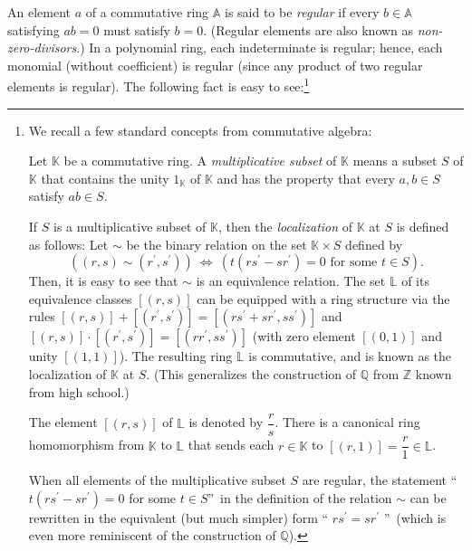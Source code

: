 \documentclass[numbers=enddot,12pt,final,onecolumn,notitlepage]{scrartcl}%
\theoremstyle{definition}
\begin{document}
An element $a$ of a commutative ring $\mathbb{A}$ is said to be
\textit{regular} if every $b\in\mathbb{A}$ satisfying $ab=0$ must satisfy
$b=0$. (Regular elements are also known as \textit{non-zero-divisors}.) In a
polynomial ring, each indeterminate is regular; hence, each monomial (without
coefficient) is regular (since any product of two regular elements is
regular). The following fact is easy to see:\footnote{We recall a few standard
concepts from commutative algebra:
\par
Let $\mathbb{K}$ be a commutative ring. A \textit{multiplicative subset} of
$\mathbb{K}$ means a subset $S$ of $\mathbb{K}$ that contains the unity
$1_{\mathbb{K}}$ of $\mathbb{K}$ and has the property that every $a,b\in S$
satisfy $ab\in S$.
\par
If $S$ is a multiplicative subset of $\mathbb{K}$, then the
\textit{localization} of $\mathbb{K}$ at $S$ is defined as follows: Let $\sim$
be the binary relation on the set $\mathbb{K}\times S$ defined by%
\[
\left(  \left(  r,s\right)  \sim\left(  r^{\prime},s^{\prime}\right)  \right)
\ \Longleftrightarrow\ \left(  t\left(  rs^{\prime}-sr^{\prime}\right)
=0\text{ for some }t\in S\right)  .
\]
Then, it is easy to see that $\sim$ is an equivalence relation. The set
$\mathbb{L}$ of its equivalence classes $\left[  \left(  r,s\right)  \right]
$ can be equipped with a ring structure via the rules $\left[  \left(
r,s\right)  \right]  +\left[  \left(  r^{\prime},s^{\prime}\right)  \right]
=\left[  \left(  rs^{\prime}+sr^{\prime},ss^{\prime}\right)  \right]  $ and
$\left[  \left(  r,s\right)  \right]  \cdot\left[  \left(  r^{\prime
},s^{\prime}\right)  \right]  =\left[  \left(  rr^{\prime},ss^{\prime}\right)
\right]  $ (with zero element $\left[  \left(  0,1\right)  \right]  $ and
unity $\left[  \left(  1,1\right)  \right]  $). The resulting ring
$\mathbb{L}$ is commutative, and is known as the localization of $\mathbb{K}$
at $S$. (This generalizes the construction of $\mathbb{Q}$ from $\mathbb{Z}$
known from high school.)
\par
The element $\left[  \left(  r,s\right)  \right]  $ of $\mathbb{L}$ is denoted
by $\dfrac{r}{s}$. There is a canonical ring homomorphism from $\mathbb{K}$ to
$\mathbb{L}$ that sends each $r\in\mathbb{K}$ to $\left[  \left(  r,1\right)
\right]  =\dfrac{r}{1}\in\mathbb{L}$.
\par
When all elements of the multiplicative subset $S$ are regular, the statement
\textquotedblleft$t\left(  rs^{\prime}-sr^{\prime}\right)  =0$ for some $t\in
S$\textquotedblright\ in the definition of the relation $\sim$ can be
rewritten in the equivalent (but much simpler) form \textquotedblleft%
$rs^{\prime}=sr^{\prime}$ \textquotedblright\ (which is even more reminiscent
of the construction of $\mathbb{Q}$).}
\end{document}
